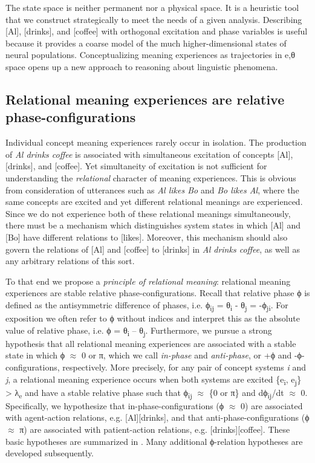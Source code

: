   The state space is neither permanent nor a physical space. It is a heuristic tool that we construct strategically to meet the needs of a given analysis. Describing [Al], [drinks], and [coffee] with orthogonal excitation and phase variables is useful because it provides a coarse model of the much higher-dimensional states of neural populations. Conceptualizing meaning experiences as trajectories in e,θ space opens up a new approach to reasoning about linguistic phenomena.

\subsection{Relational meaning experiences are relative phase-configurations}

Individual concept meaning experiences rarely occur in isolation. The production of \textit{Al drinks coffee} is associated with simultaneous excitation of concepts [Al], [drinks], and [coffee]. Yet simultaneity of excitation is not sufficient for understanding the \textit{relational} character of meaning experiences. This is obvious from consideration of utterances such as \textit{Al likes Bo} and \textit{Bo likes Al}, where the same concepts are excited and yet different relational meanings are experienced. Since we do not experience both of these relational meanings simultaneously, there must be a mechanism which distinguishes system states in which [Al] and [Bo] have different relations to [likes]. Moreover, this mechanism should also govern the relations of [Al] and [coffee] to [drinks] in \textit{Al drinks coffee}, as well as any arbitrary relations of this sort. 

  To that end we propose a \textit{principle of relational meaning}: relational meaning experiences are stable relative phase-configurations. Recall that relative phase ϕ is defined as the antisymmetric difference of phases, i.e. ϕ\textsubscript{ij} = θ\textsubscript{i} - θ\textsubscript{j} = -ϕ\textsubscript{ji}. For exposition we often refer to ϕ without indices and interpret this as the absolute value of relative phase, i.e. {\textbar}ϕ{\textbar} = {\textbar}θ\textsubscript{i} – θ\textsubscript{j}{\textbar}. Furthermore, we pursue a strong hypothesis that all relational meaning experiences are associated with a stable state in which ϕ ${\approx}$ 0 or π, which we call \textit{in-phase} and \textit{anti-phase}, or +ϕ and -ϕ-configurations, respectively. More precisely, for any pair of concept systems \textit{i} and \textit{j}, a relational meaning experience occurs when both systems are excited \{e\textsubscript{i}, e\textsubscript{j}\} > λ\textsubscript{e} and have a stable relative phase such that {\textbar}ϕ\textsubscript{ij}{\textbar} ${\approx}$ \{0 or π\} and dϕ\textsubscript{ij}/dt ${\approx}$ 0. Specifically, we hypothesize that in-phase-configurations (ϕ ${\approx}$ 0) are associated with agent-action relations, e.g. [Al][drinks], and that anti-phase-configurations (ϕ ${\approx}$ π) are associated with patient-action relations, e.g. [drinks][coffee]. These basic hypotheses are summarized in {}. Many additional ϕ-relation hypotheses are developed subsequently.

